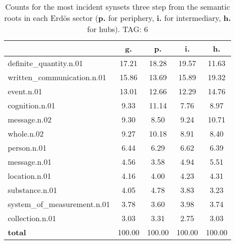 \begin{table}[h!]
\begin{center}
\begin{tabular}{| l || c | c | c | c |}\hline
 & {\bf g.} & {\bf p.} & {\bf i.} & {\bf h.} \\\hline\hline
definite\_quantity.n.01 & 17.21  & 18.28  & 19.57  & 11.63 \\\hline
written\_communication.n.01 & 15.86  & 13.69  & 15.89  & 19.32 \\\hline
event.n.01 & 13.01  & 12.66  & 12.29  & 14.76 \\\hline
cognition.n.01 & 9.33  & 11.14  & 7.76  & 8.97 \\\hline
message.n.02 & 9.30  & 8.50  & 9.24  & 10.71 \\\hline
whole.n.02 & 9.27  & 10.18  & 8.91  & 8.40 \\\hline
person.n.01 & 6.44  & 6.29  & 6.62  & 6.39 \\\hline
message.n.01 & 4.56  & 3.58  & 4.94  & 5.51 \\\hline
location.n.01 & 4.16  & 4.00  & 4.23  & 4.31 \\\hline
substance.n.01 & 4.05  & 4.78  & 3.83  & 3.23 \\\hline
system\_of\_measurement.n.01 & 3.78  & 3.60  & 3.98  & 3.74 \\\hline
collection.n.01 & 3.03  & 3.31  & 2.75  & 3.03 \\\hline\hline
{{\bf total}} & 100.00  & 100.00  & 100.00  & 100.00 \\\hline
\end{tabular}
\caption{Counts for the most incident synsets three step from the semantic roots in each Erd\"os sector ({\bf p.} for periphery, {\bf i.} for intermediary, {\bf h.} for hubs). TAG: 6}
\end{center}
\end{table}